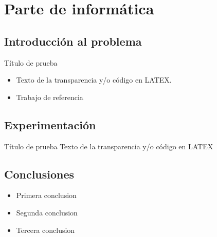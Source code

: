 \section{Parte de informática}

\subsection{Introducción al problema}
\begin{frame}{Título de prueba}
	\begin{itemize}
		\item Texto de la transparencia y/o código en LATEX.
		\item Trabajo de referencia \cite{informatica:principal}
	\end{itemize}
\end{frame}

\subsection{Experimentación}
\begin{frame}{Título de prueba}
	Texto de la transparencia y/o código en LATEX
\end{frame}

\subsection{Conclusiones}
\begin{frame}
	\begin{itemize}
		\item Primera conclusion
		\item Segunda conclusion
		\item Tercera conclusion
	\end{itemize}
\end{frame}
